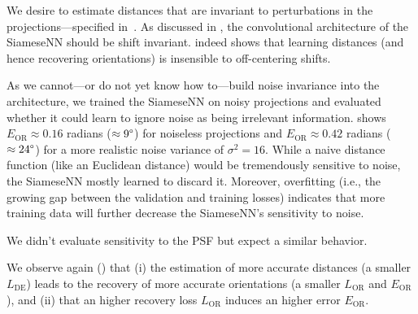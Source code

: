 We desire to estimate distances that are invariant to perturbations in the projections---specified in~.
As discussed in , the convolutional architecture of the SiameseNN should be shift invariant.
 indeed shows that learning distances (and hence recovering orientations) is insensible to off-centering shifts.

As we cannot---or do not yet know how to---build noise invariance into the architecture, we trained the SiameseNN on noisy projections and evaluated whether it could learn to ignore noise as being irrelevant information.
 shows $E_\text{OR} \approx 0.16$ radians ($\approx 9\degree$) for noiseless projections and $E_\text{OR} \approx 0.42$ radians ($\approx 24\degree$) for a more realistic noise variance of $\sigma^2=16$.
While a naive distance function (like an Euclidean distance) would be tremendously sensitive to noise, the SiameseNN mostly learned to discard it.
Moreover, overfitting (i.e., the growing gap between the validation and training losses) indicates that more training data will further decrease the SiameseNN's sensitivity to noise.

We didn't evaluate sensitivity to the PSF but expect a similar behavior.

We observe again () that (i) the estimation of more accurate distances (a smaller $L_\text{DE}$) leads to the recovery of more accurate orientations (a smaller $L_\text{OR}$ and $E_\text{OR}$), and (ii) that an higher recovery loss $L_\text{OR}$ induces an higher error $E_\text{OR}$.


